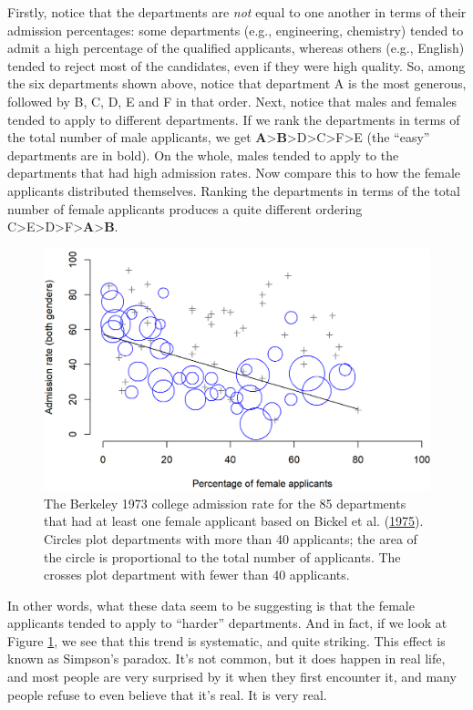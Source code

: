 \documentclass[
  11pt,
]{book}
\theoremstyle{definition}
\theoremstyle{definition}
\theoremstyle{definition}
\theoremstyle{definition}
\theoremstyle{remark}
\begin{document}
Firstly, notice that the departments are \emph{not} equal to one another in terms of their admission percentages: some departments (e.g., engineering, chemistry) tended to admit a high percentage of the qualified applicants, whereas others (e.g., English) tended to reject most of the candidates, even if they were high quality. So, among the six departments shown above, notice that department A is the most generous, followed by B, C, D, E and F in that order. Next, notice that males and females tended to apply to different departments. If we rank the departments in terms of the total number of male applicants, we get \textbf{A}\textgreater{}\textbf{B}\textgreater D\textgreater C\textgreater F\textgreater E (the ``easy'' departments are in bold). On the whole, males tended to apply to the departments that had high admission rates. Now compare this to how the female applicants distributed themselves. Ranking the departments in terms of the total number of female applicants produces a quite different ordering C\textgreater E\textgreater D\textgreater F\textgreater{}\textbf{A}\textgreater{}\textbf{B}.



\begin{figure}[h]

{\centering \includegraphics[width=0.66\linewidth]{resources/image/berkeley} 

}

\caption[The Berkeley 1973 college admissions data.]{The Berkeley 1973 college admission rate for the 85 departments that had at least one female applicant based on Bickel et al. (\protect\hyperlink{ref-Bickel1975}{1975}). Circles plot departments with more than 40 applicants; the area of the circle is proportional to the total number of applicants. The crosses plot department with fewer than 40 applicants.}\label{fig:berkeley}
\end{figure}

In other words, what these data seem to be suggesting is that the female applicants tended to apply to ``harder'' departments. And in fact, if we look at Figure \ref{fig:berkeley}, we see that this trend is systematic, and quite striking. This effect is known as Simpson's paradox. It's not common, but it does happen in real life, and most people are very surprised by it when they first encounter it, and many people refuse to even believe that it's real. It is very real.
\end{document}
